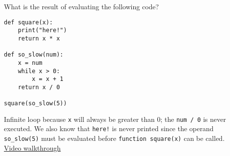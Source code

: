 \begin{blocksection}
\question What is the result of evaluating the following code?

\begin{lstlisting}
def square(x):
    print("here!")
    return x * x

def so_slow(num):
    x = num
    while x > 0:
        x = x + 1
    return x / 0

square(so_slow(5))
\end{lstlisting}

\begin{solution}[0.25in]
Infinite loop because \lstinline$x$ will always be greater than 0; the
\lstinline$num / 0$ is never executed. We also know that \texttt{here!}
is never printed since the operand \texttt{so\_slow(5)} must be evaluated
before \texttt{function square(x)} can be called. \\
\href{https://www.youtube.com/watch?v=Fiw0f5yuQgo&vq=hd1080&t=39m34s}{Video walkthrough}
\end{solution}
\end{blocksection}
